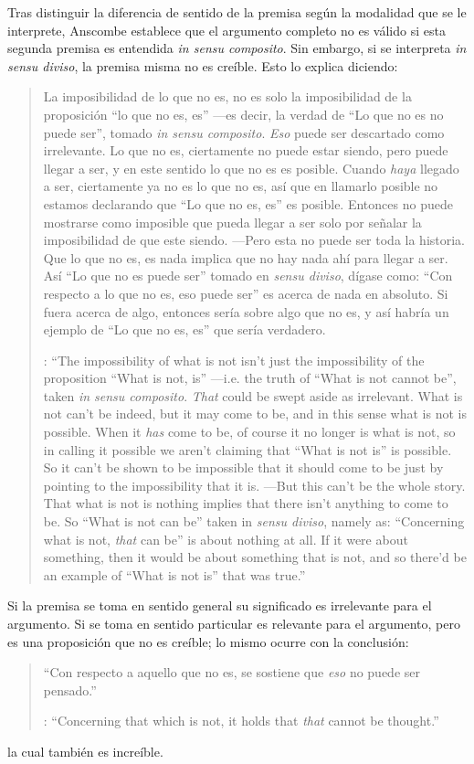 Tras distinguir la diferencia de sentido de la premisa según la modalidad que se le interprete, Anscombe establece que el argumento completo no es válido si esta segunda premisa es entendida \emph{in sensu composito}. Sin embargo, si se interpreta \emph{in sensu diviso}, la premisa misma no es creíble. Esto lo explica diciendo: \blockquote[{\cite[vii]{anscombe1981parmenides}}: \enquote{The impossibility of what is not isn't just the impossibility of the proposition ``What is not, is'' ---i.e. the truth of ``What is not cannot be'', taken \emph{in sensu composito}. \emph{That} could be swept aside as irrelevant. What is not can't be indeed, but it may come to be, and in this sense what is not is possible. When it \emph{has} come to be, of course it no longer is what is not, so in calling it possible we aren't claiming that ``What is not is'' is possible. So it can't be shown to be impossible that it should come to be just by pointing to the impossibility that it is. ---But this can't be the whole story. That what is not is nothing implies that there isn't anything to come to be. So ``What is not can be'' taken in \emph{sensu diviso}, namely as: ``Concerning what is not, \emph{that} can be'' is about nothing at all. If it were about something, then it would be about something that is not, and so there'd be an example of ``What is not is'' that was true.}]{La imposibilidad de lo que no es, no es solo la imposibilidad de la proposición ``lo que no es, es'' ---es decir, la verdad de ``Lo que no es no puede ser'', tomado \emph{in sensu composito}. \emph{Eso} puede ser descartado como irrelevante. Lo que no es, ciertamente no puede estar siendo, pero puede llegar a ser, y en este sentido lo que no es es posible. Cuando \emph{haya} llegado a ser, ciertamente ya no es lo que no es, así que en llamarlo posible no estamos declarando que ``Lo que no es, es'' es posible. Entonces no puede mostrarse como imposible que pueda llegar a ser solo por señalar la imposibilidad de que este siendo. ---Pero esta no puede ser toda la historia. Que lo que no es, es nada implica que no hay nada ahí para llegar a ser. Así ``Lo que no es puede ser'' tomado en \emph{sensu diviso}, dígase como: ``Con respecto a lo que no es, eso puede ser'' es acerca de nada en absoluto. Si fuera acerca de algo, entonces sería sobre algo que no es, y así habría un ejemplo de ``Lo que no es, es'' que sería verdadero.} Si la premisa se toma en sentido general su significado es irrelevante para el argumento. Si se toma en sentido particular es relevante para el argumento, pero es una proposición que no es creíble; lo mismo ocurre con la conclusión: \blockquote[{\cite[3]{anscombe1981parmenides:pmc}}: \enquote{Concerning that which is not, it holds that \emph{that} cannot be thought.}]{\enquote{Con respecto a aquello que no es, se sostiene que \emph{eso} no puede ser pensado.}} la cual también es increíble.

